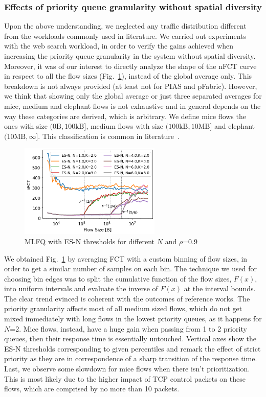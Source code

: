 \subsubsection{Effects of priority queue granularity without spatial diversity}
Upon the above understanding, we neglected any traffic distribution different from the workloads commonly used in literature. We carried out experiments with the web search workload, in order to verify the gains achieved when increasing the priority queue granularity in the system without spatial diversity. Moreover, it was of our interest to directly analyze the shape of the nFCT curve in respect to all the flow sizes (Fig.~\ref{fig:esn_varying_N}), instead of the global average only. This breakdown is not always provided (at least not for PIAS and pFabric). However, we think that showing only the global average or just three separated averages for mice, medium and elephant flows is not exhaustive and in general depends on the way these categories are derived, which is arbitrary. We define mice flows the ones with size $(0\text{B}, 100\text{kB}]$, medium flows with size $(100\text{kB}, 10\text{MB}]$ and elephant $(10\text{MB}, \infty]$. This classification is common in literature~\cite{pias, nos2, one-more-queue}.\\
\begin{figure}
	\centering
	\includegraphics[width=0.6\textwidth]{Chapter4/Figures/esn}
	\caption{MLFQ with ES-N thresholds for different $N$ and $\rho$=0.9}
	\label{fig:esn_varying_N}
\end{figure}%
We obtained Fig.~\ref{fig:esn_varying_N} by averaging FCT with a custom binning of flow sizes, in order to get a similar number of samples on each bin. The technique we used for choosing bin edges was to split the cumulative function of the flow sizes, $F(x)$, into uniform intervals and evaluate the inverse of $F(x)$ at the interval bounds. The clear trend evinced is coherent with the outcomes of reference works. The priority granularity affects most of all medium sized flows, which do not get mixed immediately with long flows in the lowest priority queues, as it happens for $N$=2. Mice flows, instead, have a huge gain when passing from 1 to 2 priority queues, then their response time is essentially untouched. Vertical axes show the ES-N thresholds corresponding to given percentiles and remark the effect of strict priority as they are in correspondence of a sharp transition of the response time. Last, we observe some slowdown for mice flows when there isn't prioritization. This is most likely due to the higher impact of TCP control packets on these flows, which are comprised by no more than 10 packets.
